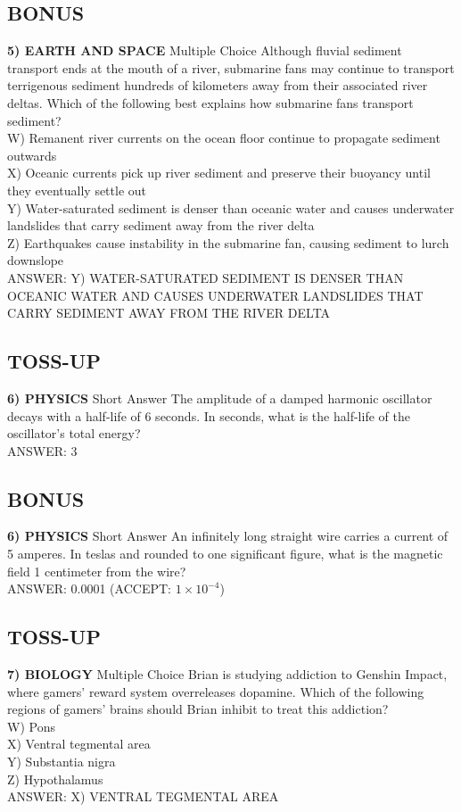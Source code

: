 \documentclass{article}
\begin{document}
\subsection*{BONUS}
\textbf{5) EARTH AND SPACE} Multiple Choice Although fluvial sediment transport ends at the mouth of a river, submarine fans may continue to transport terrigenous sediment hundreds of kilometers away from their associated river deltas. Which of the following best explains how submarine fans transport sediment?
\\W) Remanent river currents on the ocean floor continue to propagate sediment outwards
\\X) Oceanic currents pick up river sediment and preserve their buoyancy until they eventually settle out
\\Y) Water-saturated sediment is denser than oceanic water and causes underwater landslides that carry sediment away from the river delta
\\Z) Earthquakes cause instability in the submarine fan, causing sediment to lurch downslope
\\ANSWER: Y) WATER-SATURATED SEDIMENT IS DENSER THAN OCEANIC WATER AND CAUSES UNDERWATER LANDSLIDES THAT CARRY SEDIMENT AWAY FROM THE RIVER DELTA

\subsection*{TOSS-UP}
\textbf{6) PHYSICS} Short Answer The amplitude of a damped harmonic oscillator decays with a half-life of 6 seconds. In seconds, what is the half-life of the oscillator's total energy?
\\ANSWER: 3

\subsection*{BONUS}
\textbf{6) PHYSICS} Short Answer An infinitely long straight wire carries a current of 5 amperes. In teslas and rounded to one significant figure, what is the magnetic field 1 centimeter from the wire?
\\ANSWER: 0.0001 (ACCEPT: $1\times10^{-4}$)

\subsection*{TOSS-UP}
\textbf{7) BIOLOGY} Multiple Choice Brian is studying addiction to Genshin Impact, where gamers' reward system overreleases dopamine. Which of the following regions of gamers' brains should Brian inhibit to treat this addiction?
\\W) Pons
\\X) Ventral tegmental area
\\Y) Substantia nigra
\\Z) Hypothalamus
\\ANSWER: X) VENTRAL TEGMENTAL AREA
\end{document}
